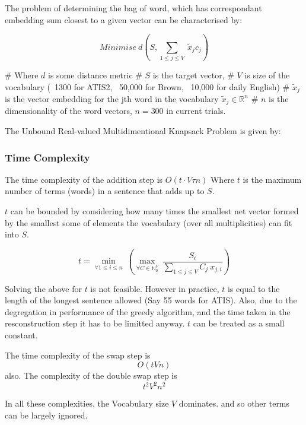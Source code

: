 \documentclass[]{scrartcl}
\begin{document}
The problem of determining the bag of word, which has correspondant embedding sum closest to a given vector can be characterised by:

$$Minimise\: d(S, \sum_{1\le j\le V}\:\tilde{x}_{j}c_{j})$$
\begin{easylist}[itemize]
# Where $d$ is some distance metric
# $S$ is the target vector,
# $V$ is size of the vocabulary (~1300 for ATIS2, ~50,000 for Brown, ~10,000 for daily English)
# $\tilde{x}_j$ is the vector embedding for the jth word in the vocabulary $\tilde{x}_j \in \mathbb{R}^n$
# $n$ is the dimensionality of the word vectors, $n = 300$ in current trials.  
\end{easylist}

The Unbound Real-valued  Multidimentional Knapsack Problem is given by:



\subsubsection{Time Complexity}
The time complexity of the addition step is $O(t \cdot V\tau n)$
Where $t$ is the maximum number of terms (words) in a sentence that adds up to $S$.

$t$ can be bounded by considering how many times the smallest net vector formed by the smallest some of elements the vocabulary (over all multiplicities) can fit into $S$.

$$t = \min_{\forall 1 \le i \le n}\: \left(\max_{\forall C \in \mathbb{N}_0^V}\: \frac{S_i}{\sum_{1\le j \le V} C_j\: x_{j,i}} \right)$$

Solving the above for $t$ is not feasible. However in practice, $t$ is equal to the length of the longest sentence allowed (Say 55 words for ATIS). Also, due to the degregation in performance of the greedy algorithm, and the time taken in the resconstruction step it has to be limitted anyway. $t$ can be treated as a small constant.

The time complexity of the swap step is $$O(tVn)$$ also.
The complexity of the double swap step is $$t^2 V^2 n^2$$

In all these complexities, the Vocabulary size $V$ dominates. and so other terms can be largely ignored.
\end{document}
